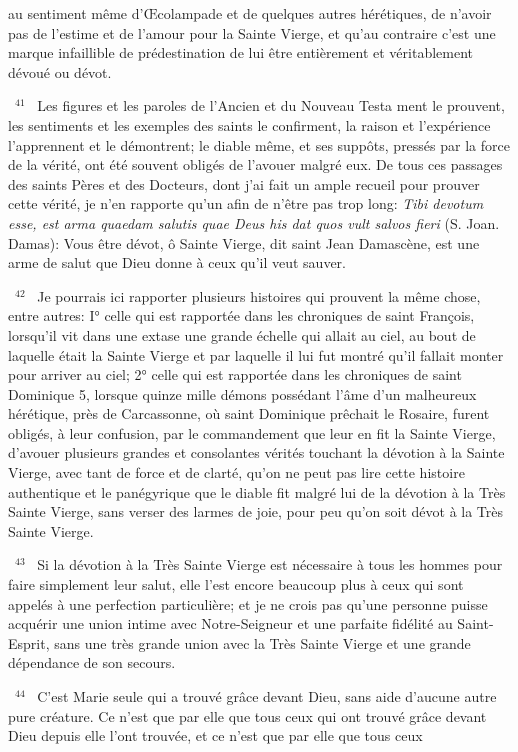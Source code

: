 \documentclass[paper=a5,pagesize=pdftex,fontsize=15pt,headinclude=on,twoside=off]{scrbook}
\newcommand{\negphantom}[1]{\settowidth{\dimen0}{#1}\hspace*{-\dimen0}}
\newcommand{\versenb}[1]{\par \vspace{10pt}~\negphantom{~${}^{#1}$~}${}^{#1}$~}
\newcommand{\latin}[1]{\emph{#1}}
\begin{document}
au sentiment même d'Œcolampade et de quelques autres hérétiques, de n'avoir pas de l'estime et de l'amour pour
la Sainte Vierge, et qu'au contraire c'est une marque infaillible de prédestination de lui être entièrement et
véritablement dévoué ou dévot.
\versenb{41} Les figures et les paroles de l'Ancien et du Nouveau Testa ment le prouvent, les sentiments et les exemples
des saints le confirment, la raison et l'expérience l'apprennent et le démontrent; le diable même, et ses suppôts,
pressés par la force de la vérité, ont été souvent obligés de l'avouer malgré eux. De tous ces passages des saints
Pères et des Docteurs, dont j'ai fait un ample recueil pour prouver cette vérité, je n'en rapporte qu'un afin de n'être
pas trop long: \latin{Tibi devotum esse, est arma quaedam salutis quae Deus his dat quos vult salvos fieri} (S. Joan.
Damas): Vous être dévot, ô Sainte Vierge, dit saint Jean Damascène, est une arme de salut que Dieu donne à
ceux qu'il veut sauver.
\versenb{42} Je pourrais ici rapporter plusieurs histoires qui prouvent la même chose, entre autres: I° celle qui est rapportée
dans les chroniques de saint François, lorsqu'il vit dans une extase une grande échelle qui allait au ciel, au bout de
laquelle était la Sainte Vierge et par laquelle il lui fut montré qu'il fallait monter pour arriver au ciel; 2° celle qui est
rapportée dans les chroniques de saint Dominique 5, lorsque quinze mille démons possédant l'âme d'un
malheureux hérétique, près de Carcassonne, où saint Dominique prêchait le Rosaire, furent obligés, à leur
confusion, par le commandement que leur en fit la Sainte Vierge, d'avouer plusieurs grandes et consolantes
vérités touchant la dévotion à la Sainte Vierge, avec tant de force et de clarté, qu'on ne peut pas lire cette histoire
authentique et le panégyrique que le diable fit malgré lui de la dévotion à la Très Sainte Vierge, sans verser des
larmes de joie, pour peu qu'on soit dévot à la Très Sainte Vierge.
\versenb{43} Si la dévotion à la Très Sainte Vierge est nécessaire à tous les hommes pour faire simplement leur salut, elle
l'est encore beaucoup plus à ceux qui sont appelés à une perfection particulière; et je ne crois pas qu'une
personne puisse acquérir une union intime avec Notre-Seigneur et une parfaite fidélité au Saint-Esprit, sans une
très grande union avec la Très Sainte Vierge et une grande dépendance de son secours.
\versenb{44} C'est Marie seule qui a trouvé grâce devant Dieu, sans aide d'aucune autre pure créature. Ce n'est que par
elle que tous ceux qui ont trouvé grâce devant Dieu depuis elle l'ont trouvée, et ce n'est que par elle que tous ceux
\end{document}
